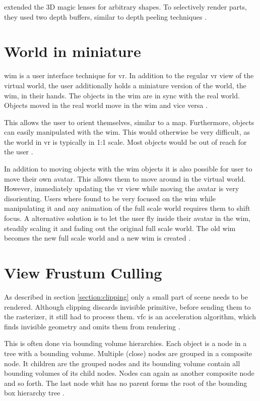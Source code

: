 \textcite{ropinski:2004:real} extended the 3D magic lenses for arbitrary shapes. To selectively render parts, they used two depth buffers, similar to depth peeling techniques \cite{everitt:2001:interactive}.

\section{World in miniature}
\Gls{wim} is a user interface technique for \gls{vr}. In addition to the regular \gls{vr} view of the virtual world, the user additionally holds a miniature version of the world, the \gls{wim}, in their hands. The objects in the \gls{wim} are in sync with the real world. Objects moved in the real world move in the  \gls{wim} and vice versa \cite{stoakley:1995:virtual}. 

This allows the user to orient themselves, similar to a map. Furthermore, objects can easily manipulated with the \gls{wim}. This would otherwise be very difficult, as the world in \gls{vr} is typically in 1:1 scale. Most objects would be out of reach for the user \cite{stoakley:1995:virtual}.

In addition to moving objects with  the \gls{wim} objects it is also possible for user to move their own avatar. This allows them to move around in the virtual world. However, immediately updating the \gls{vr} view while moving the avatar is very disorienting. Users where found to be very focused on the \gls{wim} while manipulating it and any animation of the full scale world requires them to shift focus. A alternative solution is to let the user fly inside their avatar in the \gls{wim}, steadily scaling it and fading out the original full scale world. The old \gls{wim} becomes the new full scale world and a new \gls{wim} is created \cite{pausch:1995:navigation}.




\section{View Frustum Culling}
As described in section \ref{section:clipping} only a small part of scene needs to be rendered. Although clipping discards invisible primitive, before sending them to the rasterizer, it still had to process them. \Gls{vfc} is an acceleration algorithm, which finds invisible geometry and omits them from rendering \cite{assarsson:2000:optimized, akine:2018:realtime}.

This is often done via bounding volume hierarchies. Each object is a node in a tree with a bounding volume. Multiple (close) nodes are grouped in a composite node. It children are the grouped nodes and its bounding volume contain all bounding volumes of its child nodes. Nodes can again as another composite node and so forth. The last node whit has no parent forms the root of the bounding box hierarchy tree \cite{clark:1976:hierarchical, assarsson:2000:optimized, akine:2018:realtime}.


